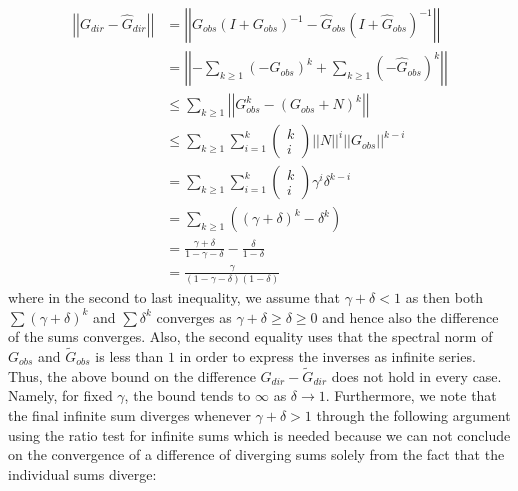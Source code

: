 \documentclass[../Thesis.tex]{subfiles}
\begin{document}
\begin{equation}\label{eq:original noise error bound}
    \begin{split}
        \left|\left| G_{dir} - \hat{G}_{dir} \right|\right| & = \left|\left| G_{obs} \left(I + G_{obs}\right)^{-1} - \hat{G}_{obs}\left(I+\hat{G}_{obs}\right)^{-1}\right|\right|                            \\
                                                            & = \left|\left| - \sum_{k\geq 1} \left( - G_{obs}\right)^k  +  \sum_{k\geq 1} \left(-\hat{G}_{obs}\right)^k \right|\right|                      \\
                                                            & \leq \sum_{k\geq 1} \left|\left|  G_{obs}^k  -  \left(G_{obs} + N\right)^k \right|\right|                                                      \\
                                                            & \leq \sum_{k \geq 1} \sum_{i=1}^{k} \begin{pmatrix}k\\i\end{pmatrix} \left|\left| N \right|\right|^i \left|\left| G_{obs} \right|\right|^{k-i} \\
                                                            & = \sum_{k \geq 1} \sum_{i=1}^{k} \begin{pmatrix}k\\i\end{pmatrix} \gamma ^i \delta^{k-i}                                                       \\
                                                            & = \sum_{k\geq 1} \left( \left( \gamma + \delta\right)^k - \delta^k \right)                                                                     \\
                                                            & = \frac{\gamma + \delta}{1 - \gamma - \delta} - \frac{\delta}{1 - \delta}                                                                      \\
                                                            & = \frac{\gamma}{(1-\gamma - \delta)(1-\delta)}
    \end{split}
\end{equation}
where in the second to last inequality, we assume that $\gamma + \delta < 1$ as then both $\sum \left(\gamma + \delta\right)^k$ and $\sum \delta^k$ converges as $\gamma + \delta \geq \delta \geq 0$ and hence also the difference of the sums converges. Also, the second equality uses that the spectral norm of $G_{obs}$ and $\tilde{G}_{obs}$ is less than $1$ in order to express the inverses as infinite series. Thus, the above bound on the difference $G_{dir} - \tilde{G}_{dir}$ does not hold in every case. Namely, for fixed $\gamma$, the bound tends to $\infty$ as $\delta \to 1$. Furthermore, we note that the final infinite sum diverges whenever $\gamma + \delta > 1$ through the following argument using the ratio test for infinite sums which is needed because we can not conclude on the convergence of a difference of diverging sums solely from the fact that the individual sums diverge:
\end{document}
